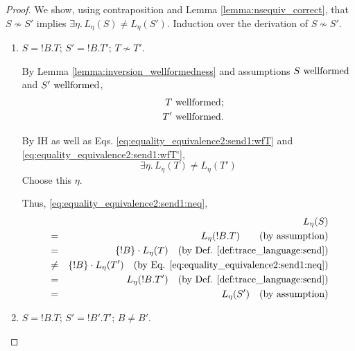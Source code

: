 \documentclass{llncs}
\newcommand*{\nsequiv}{\not\sim}
\newcommand*{\send}{\mathord{!}}
\newcommand*{\concat}{\cdot}
\newcommand*{\wf}[1]{\text{$#1$ {\normalfont \rmfamily wellformed}}}
\renewcommand*{\|}{\;|\;}
\begin{document}
\begin{proof}
  We show, using contraposition and Lemma \ref{lemma:nsequiv_correct},
  that $S \nsequiv S'$ implies $\exists \eta.\, L_\eta(S) \neq L_\eta(S')$.
  Induction over the derivation of $S \nsequiv S'$.

  \begin{enumerate}
    \item
      \label{case:equality_equivalence2:send1}
      $S = \send B.T$; $S' = \send B.T'$; $T \nsequiv T'$.

      By Lemma \ref{lemma:inversion_wellformedness} and assumptions
      $\wf{S}$ and $\wf{S'}$,
      \begin{eqnarray}
        \label{eq:equality_equivalence2:send1:wfT}
        && \wf{T}; \\
        \label{eq:equality_equivalence2:send1:wfT'}
        && \wf{T'}.
      \end{eqnarray}

      By IH as well as Eqs. \ref{eq:equality_equivalence2:send1:wfT} and
      \ref{eq:equality_equivalence2:send1:wfT'},
      \begin{equation}
        \label{eq:equality_equivalence2:send1:neq}
        \exists \eta.\, L_\eta(T) \neq L_\eta(T')
      \end{equation}
      Choose this $\eta$.

      Thus,
      \ref{eq:equality_equivalence2:send1:neq},
      \begin{eqnarray*}
        &&     L_\eta(S) \\
        &=&    L_\eta(\send B.T) \quad \text
               \quad \text{(by assumption)} \\
        &=&    \{\send B\} \concat L_\eta(T)
               \quad \text{(by Def. \ref{def:trace_language:send})} \\
        &\neq& \{\send B\} \concat L_\eta(T')
               \quad \text{(by Eq. \ref{eq:equality_equivalence2:send1:neq})} \\
        &=&    L_\eta(\send B.T')
               \quad \text{(by Def. \ref{def:trace_language:send})} \\
        &=&    L_\eta(S')
               \quad \text{(by assumption)}
      \end{eqnarray*}

    \item
      \label{case:equality_equivalence2:send2}
      $S = \send B.T$; $S' = \send B'.T'$; $B \neq B'$.


\end{enumerate}
\end{proof}
\end{document}

